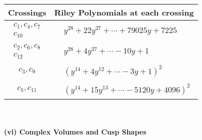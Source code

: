 \documentclass[1p]{elsarticle_modified}
\theoremstyle{definition}
\begin{document}
\begin{tabular}{m{50pt}|m{274pt}}
Crossings & \hspace{64pt}Riley Polynomials at each crossing \\
\hline $$\begin{aligned}c_{1},c_{4},c_{7}\\c_{10}\end{aligned}$$&$\begin{aligned}
&y^{28}+22 y^{27}+\cdots+79025 y+7225
\end{aligned}$\\
\hline $$\begin{aligned}c_{2},c_{6},c_{8}\\c_{12}\end{aligned}$$&$\begin{aligned}
&y^{28}+4 y^{27}+\cdots-10 y+1
\end{aligned}$\\
\hline $$\begin{aligned}c_{3},c_{9}\end{aligned}$$&$\begin{aligned}
&(y^{14}+4 y^{12}+\cdots-3 y+1)^{2}
\end{aligned}$\\
\hline $$\begin{aligned}c_{5},c_{11}\end{aligned}$$&$\begin{aligned}
&(y^{14}+15 y^{13}+\cdots-5120 y+4096)^{2}
\end{aligned}$\\
\hline
\end{tabular}\\~\\
\newpage\flushleft \textbf{(vi) Complex Volumes and Cusp Shapes}
\end{document}
